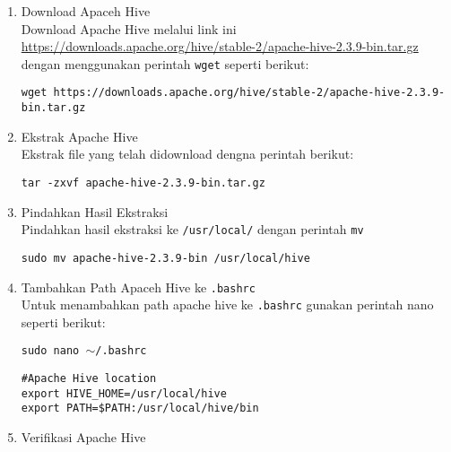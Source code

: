 \documentclass[a4paper]{tufte-handout}
\begin{document}
\begin{enumerate}
\item Download Apaceh Hive \\
Download Apache Hive melalui link ini \url{https://downloads.apache.org/hive/stable-2/apache-hive-2.3.9-bin.tar.gz} dengan menggunakan perintah {\tt wget} seperti berikut:

{\tt wget https://downloads.apache.org/hive/stable-2/apache-hive-2.3.9-bin.tar.gz}

\item Ekstrak Apache Hive \\
Ekstrak file yang telah didownload dengna perintah berikut:

{\tt tar -zxvf apache-hive-2.3.9-bin.tar.gz}

\item Pindahkan Hasil Ekstraksi \\
Pindahkan hasil ekstraksi ke {\tt /usr/local/} dengan perintah {\tt mv}

{\tt sudo mv apache-hive-2.3.9-bin /usr/local/hive}

\item Tambahkan Path Apaceh Hive ke {\tt .bashrc} \\
Untuk menambahkan path apache hive ke {\tt .bashrc} gunakan perintah nano
seperti berikut:

{\tt sudo nano $\sim$/.bashrc}

\begin{lstlisting}
#Apache Hive location
export HIVE_HOME=/usr/local/hive
export PATH=$PATH:/usr/local/hive/bin
\end{lstlisting}

\item Verifikasi Apache Hive \\
\end{enumerate}

\clearpage
{}

























\clearpage


\end{document}
